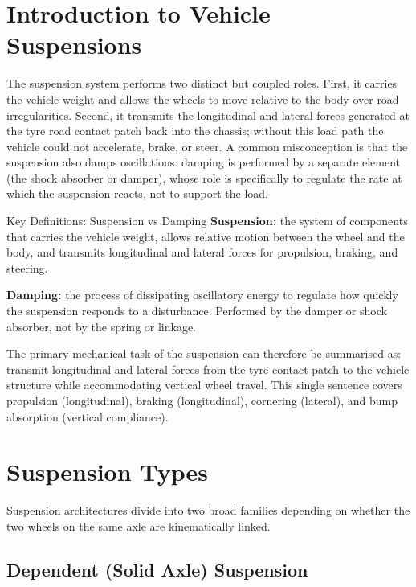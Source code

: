 \documentclass[10pt,a4paper]{article}
\begin{document}
\notestitle

\notestoc
\newpage


\section{Introduction to Vehicle Suspensions}

The suspension system performs two distinct but coupled roles. First, it carries the vehicle weight and allows the wheels to move relative to the body over road irregularities. Second, it transmits the longitudinal and lateral forces generated at the tyre road contact patch back into the chassis; without this load path the vehicle could not accelerate, brake, or steer. A common misconception is that the suspension also damps oscillations: damping is performed by a separate element (the shock absorber or damper), whose role is specifically to regulate the rate at which the suspension reacts, not to support the load.

\begin{defbox}{Key Definitions: Suspension vs Damping}
\textbf{Suspension:} the system of components that carries the vehicle weight, allows relative motion between the wheel and the body, and transmits longitudinal and lateral forces for propulsion, braking, and steering.

\textbf{Damping:} the process of dissipating oscillatory energy to regulate how quickly the suspension responds to a disturbance. Performed by the damper or shock absorber, not by the spring or linkage.
\end{defbox}

The primary mechanical task of the suspension can therefore be summarised as: transmit longitudinal and lateral forces from the tyre contact patch to the vehicle structure while accommodating vertical wheel travel. This single sentence covers propulsion (longitudinal), braking (longitudinal), cornering (lateral), and bump absorption (vertical compliance).

\section{Suspension Types}

Suspension architectures divide into two broad families depending on whether the two wheels on the same axle are kinematically linked.

\subsection{Dependent (Solid Axle) Suspension}
\end{document}
